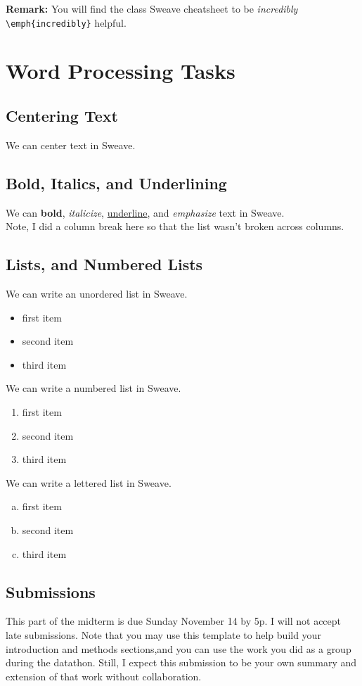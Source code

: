 \documentclass{article}\usepackage[]{graphicx}\usepackage[]{xcolor}
\begin{document}
\begin{multicols}{2}
\noindent \textbf{Remark:} You will find the class Sweave cheatsheet to be \emph{incredibly} \verb|\emph{incredibly}| helpful. 
\section{Word Processing Tasks}
\subsection{Centering Text}
 \begin{center}
 We can center text in Sweave.
 \end{center}
\subsection{Bold, Italics, and Underlining}
 We can \textbf{bold}, \textit{italicize}, \underline{underline}, and \emph{emphasize} text in
 Sweave. \\
\indent Note, I did a column break here so that the list wasn’t broken across columns.
\columnbreak

\subsection{Lists, and Numbered Lists}
We can write an unordered list in Sweave.
 \begin{itemize}\itemsep0em
 \item first item
 \item second item
 \item third item
 \end{itemize}
We can write a numbered list in Sweave.
 \begin{enumerate}[1.]\itemsep0em
 \item first item
 \item second item
 \item third item
 \end{enumerate}
We can write a lettered list in Sweave.
 \begin{enumerate}[a.]\itemsep0em
 \item first item
 \item second item
 \item third item
 \end{enumerate}
\subsection{Submissions}
This part of the midterm is due Sunday November 14 by 5p. I will not accept late submissions. Note that you may use
this template to help build your introduction and methods
 sections,and you can use the work you did as a group during the datathon. Still, I expect this submission to be your own summary and extension of that work without collaboration.

\end{multicols}
\end{document}
